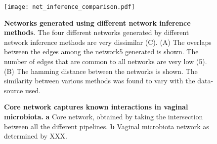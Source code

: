   \begin{figure}[h]
    \begin{center}
      \texttt{[image: net\_inference\_comparison.pdf]}
      \caption{
        \textbf{Networks generated using different network inference methods}.
        The four different networks generated by different network inference methods are very dissimilar (C).
        (A) The overlaps between the edges among the network5 generated is shown. The number of edges that are common to all networks are very low (5).
        (B) The hamming distance between the networks is shown. The similarity between various methods was found to vary with the data-source used.
      }
      \label{fig:network_comparison}
    \end{center}
  \end{figure}


  \begin{figure}[h]
    \begin{center}
      \caption{\textbf{Core network captures known interactions in vaginal microbiota.} \textbf{a} Core network, obtained by taking the intersection between all the different pipelines. \textbf{b} Vaginal microbiota network as determined by XXX.}
      \label{fig:network_comparison}
    \end{center}
  \end{figure}
